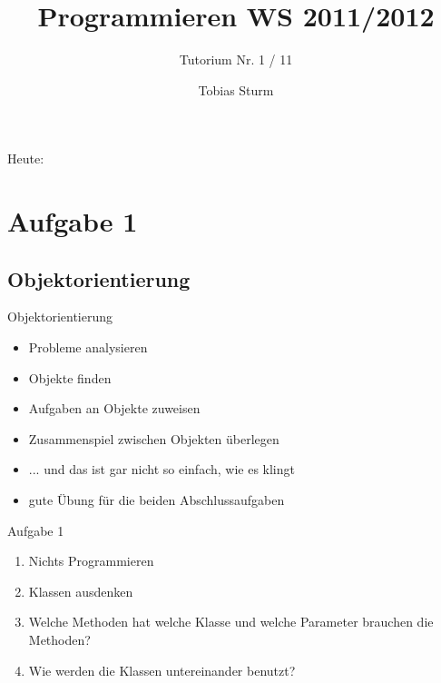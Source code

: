 \documentclass[18pt]{beamer}
\title[Proggen WS11/12]{Programmieren WS 2011/2012}
\subtitle{Tutorium Nr. 1 / 11}
\author{Tobias Sturm} %
\institute{Zertifizierbare Vertrauenswürdige Informatiksysteme}
\date[23.1.12] %
\begin{document}


\begin{frame}
	\titlepage
\end{frame}


\begin{frame}{Heute:}
	\tableofcontents
\end{frame}


\section{Aufgabe 1}
\subsection*{Objektorientierung}
\begin{frame}{Objektorientierung}
	\begin{itemize}
		\item Probleme analysieren
		\item Objekte finden
		\item Aufgaben an Objekte zuweisen
		\item Zusammenspiel zwischen Objekten überlegen\pause
		\item ... und das ist gar nicht so einfach, wie es klingt
		\item gute Übung für die beiden Abschlussaufgaben
	\end{itemize}
\end{frame}


\begin{frame}{Aufgabe 1}
	\begin{enumerate}
		\item Nichts Programmieren
		\item Klassen ausdenken
		\item Welche Methoden hat welche Klasse und welche Parameter brauchen die Methoden?
		\item Wie werden die Klassen untereinander benutzt?
	\end{enumerate}
\end{frame}
\end{document}
